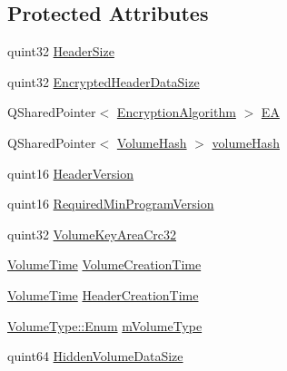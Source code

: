 \subsection*{Protected Attributes}
\begin{DoxyCompactItemize}
\item 
quint32 \hyperlink{class_gost_crypt_1_1_volume_1_1_volume_header_ab4dbd75d926241b0b0430a5f57e67a97}{Header\+Size}
\item 
quint32 \hyperlink{class_gost_crypt_1_1_volume_1_1_volume_header_a25a781bf704835adc7735afe28409f4c}{Encrypted\+Header\+Data\+Size}
\item 
Q\+Shared\+Pointer$<$ \hyperlink{class_gost_crypt_1_1_volume_1_1_encryption_algorithm}{Encryption\+Algorithm} $>$ \hyperlink{class_gost_crypt_1_1_volume_1_1_volume_header_af502a8b072d04c9cdc59a6aaed1a5915}{EA}
\item 
Q\+Shared\+Pointer$<$ \hyperlink{class_gost_crypt_1_1_volume_1_1_volume_hash}{Volume\+Hash} $>$ \hyperlink{class_gost_crypt_1_1_volume_1_1_volume_header_a2c7ee26744636f1f262d28dc0f2e13a7}{volume\+Hash}
\item 
quint16 \hyperlink{class_gost_crypt_1_1_volume_1_1_volume_header_a4f111f8e818af8aa7d0d03687636fb7d}{Header\+Version}
\item 
quint16 \hyperlink{class_gost_crypt_1_1_volume_1_1_volume_header_af0598e2c23b55eec39e4b80ae0e8178d}{Required\+Min\+Program\+Version}
\item 
quint32 \hyperlink{class_gost_crypt_1_1_volume_1_1_volume_header_a32c984961780c9bb1a4bbfa695e46b19}{Volume\+Key\+Area\+Crc32}
\item 
\hyperlink{namespace_gost_crypt_1_1_volume_a4aab8aad1263f3abd1e4949b1e428468}{Volume\+Time} \hyperlink{class_gost_crypt_1_1_volume_1_1_volume_header_a9edc6a3abf2f3b84ab44867af30be89c}{Volume\+Creation\+Time}
\item 
\hyperlink{namespace_gost_crypt_1_1_volume_a4aab8aad1263f3abd1e4949b1e428468}{Volume\+Time} \hyperlink{class_gost_crypt_1_1_volume_1_1_volume_header_ab1295ff885fe8216a48b16db486175e4}{Header\+Creation\+Time}
\item 
\hyperlink{struct_gost_crypt_1_1_volume_1_1_volume_type_a7fe1979dab76d4534dcb1e26179d4717}{Volume\+Type\+::\+Enum} \hyperlink{class_gost_crypt_1_1_volume_1_1_volume_header_a645d74bbfd6eedba63eb02ceec721466}{m\+Volume\+Type}
\item 
quint64 \hyperlink{class_gost_crypt_1_1_volume_1_1_volume_header_a5cb7e7036ba6dc889f16d6229a5c9a1d}{Hidden\+Volume\+Data\+Size}
\item 

\end{DoxyCompactItemize}
